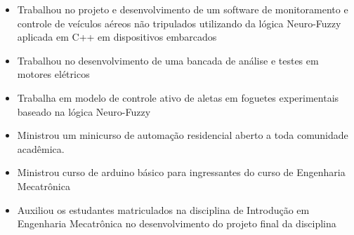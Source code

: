 \documentclass[10pt,a4paper,ragged2e]{altacv}
\begin{document}
\begin{itemize}
\item Trabalhou no projeto e desenvolvimento de um software de monitoramento e controle de veículos aéreos não tripulados utilizando da lógica Neuro-Fuzzy aplicada em C++ em dispositivos embarcados
\item Trabalhou no desenvolvimento de uma bancada de análise e testes em motores elétricos
\item Trabalha em modelo de controle ativo de aletas em foguetes experimentais baseado na lógica Neuro-Fuzzy
\end{itemize}

 \divider


\begin{itemize}
 \item Ministrou um minicurso de automação residencial aberto a toda comunidade acadêmica.
 \end{itemize}


\divider

\begin{itemize}
\item Ministrou curso de arduino básico para ingressantes do curso de Engenharia Mecatrônica
\item Auxiliou os estudantes matriculados na disciplina de Introdução em Engenharia Mecatrônica no desenvolvimento do projeto final da disciplina
\end{itemize}
\end{document}
